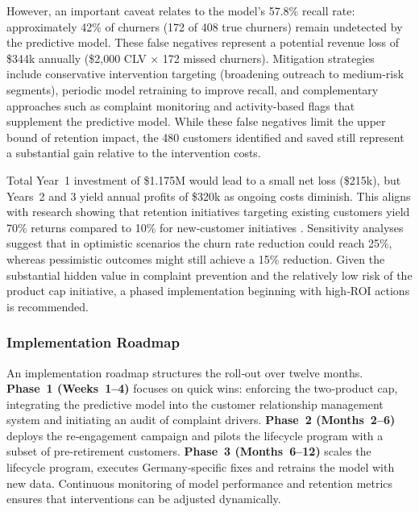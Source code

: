 \documentclass[12pt]{article}
\begin{document}
However, an important caveat relates to the model's 57.8\% recall rate: approximately 42\% of churners (172 of 408 true churners) remain undetected by the predictive model. These false negatives represent a potential revenue loss of \$344k annually (\$2,000 CLV × 172 missed churners). Mitigation strategies include conservative intervention targeting (broadening outreach to medium-risk segments), periodic model retraining to improve recall, and complementary approaches such as complaint monitoring and activity-based flags that supplement the predictive model. While these false negatives limit the upper bound of retention impact, the 480 customers identified and saved still represent a substantial gain relative to the intervention costs.

Total Year~1 investment of \$1.175M would lead to a small net loss (\$215k), but Years~2 and 3 yield annual profits of \$320k as ongoing costs diminish. This aligns with research showing that retention initiatives targeting existing customers yield 70\% returns compared to 10\% for new‑customer initiatives \citep{browning2024retention}. Sensitivity analyses suggest that in optimistic scenarios the churn rate reduction could reach 25\%, whereas pessimistic outcomes might still achieve a 15\% reduction. Given the substantial hidden value in complaint prevention and the relatively low risk of the product cap initiative, a phased implementation beginning with high‑ROI actions is recommended.

\subsubsection{Implementation Roadmap}
An implementation roadmap structures the roll‑out over twelve months.  \textbf{Phase~1 (Weeks~1–4)} focuses on quick wins: enforcing the two‑product cap, integrating the predictive model into the customer relationship management system and initiating an audit of complaint drivers.  \textbf{Phase~2 (Months~2–6)} deploys the re‑engagement campaign and pilots the lifecycle program with a subset of pre‑retirement customers.  \textbf{Phase~3 (Months~6–12)} scales the lifecycle program, executes Germany‑specific fixes and retrains the model with new data.  Continuous monitoring of model performance and retention metrics ensures that interventions can be adjusted dynamically.
\end{document}
